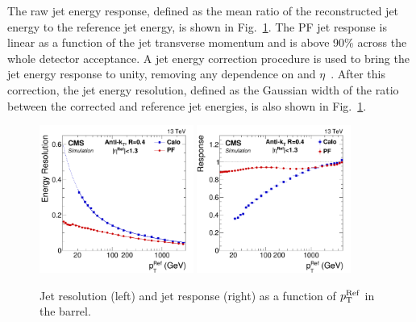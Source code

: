 
The raw jet energy response, defined as the mean ratio of the
reconstructed jet energy to the reference jet energy, is shown in
Fig.~\ref{fig:expected_performance_jets}. The PF jet response is
linear as a function of the jet transverse momentum and is above 90\%
across the whole detector acceptance. A jet energy correction procedure is used to bring the jet energy
response to unity, removing any dependence on \pt and
$\eta$~\cite{Khachatryan:2016kdb}. After this correction, the jet
energy resolution, defined as the Gaussian width of the ratio between
the corrected and reference jet energies, is also shown in Fig.~\ref{fig:expected_performance_jets}.

\begin{figure}[htbp]
  \centering 
  \includegraphics[width=0.45\textwidth]{figs/cms/RelResVsRefPt_Barrel_AK4CaloL2L3_AK4PFL2L3_no2000.pdf}
  \includegraphics[width=0.45\textwidth]{figs/cms/ClosureRatioVsRefPt_RefEta0to1dot3_ak4caloOverak4pf_no2000.pdf}
  \caption{Jet \pt resolution (left) and jet \pt response (right) as a function of $p_{\mathrm{T}}^{\mathrm{Ref}}$ in the barrel.\label{fig:expected_performance_jets}}
\end{figure}

